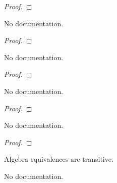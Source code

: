 \begin{proof}
    \leanok
\end{proof}

\begin{theorem}\label{ValAlgEquiv.symm_bijective}
        \leanok
                No documentation.
    \end{theorem}

\begin{proof}
    \leanok
\end{proof}

\begin{theorem}\label{ValRingEquiv.symm_injective}
        \leanok
                No documentation.
    \end{theorem}

\begin{proof}
    \leanok
\end{proof}

\begin{theorem}\label{ValRingEquiv.symm_surjective}
        \leanok
                No documentation.
    \end{theorem}

\begin{proof}
    \leanok
\end{proof}

\begin{theorem}\label{ValRingEquiv.toEquiv_symm}
        \leanok
                No documentation.
    \end{theorem}

\begin{proof}
    \leanok
\end{proof}

\begin{definition}\label{ValAlgEquiv.trans}
        \leanok
                Algebra equivalences are transitive.
    \end{definition}

\begin{theorem}\label{ValAlgEquiv.coe_trans}
        \leanok
                No documentation.
    \end{theorem}

